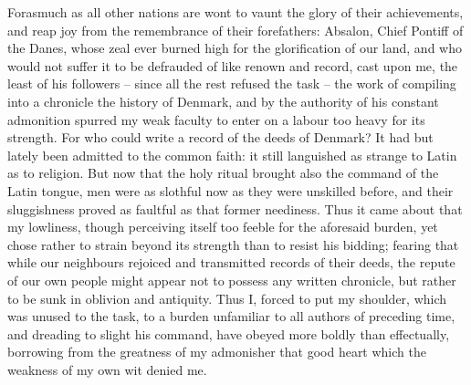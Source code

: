 \documentclass[10pt,a4paper]{report}
\begin{document}
Forasmuch as all other nations are wont to vaunt the glory of their achievements, and reap joy from the remembrance of their forefathers: Absalon, Chief Pontiff of the Danes, whose zeal ever burned high for the glorification of our land, and who would not suffer it to be defrauded of like renown and record, cast upon me, the least of his followers -- since all the rest refused the task -- the work of compiling into a chronicle the history of Denmark, and by the authority of his constant admonition spurred my weak faculty to enter on a labour too heavy for its strength. For who could write a record of the deeds of Denmark? It had but lately been admitted to the common faith: it still languished as strange to Latin as to religion. But now that the holy ritual brought also the command of the Latin tongue, men were as slothful now as they were unskilled before, and their sluggishness proved as faultful as that former neediness. Thus it came about that my lowliness, though perceiving itself too feeble for the aforesaid burden, yet chose rather to strain beyond its strength than to resist his bidding; fearing that while our neighbours rejoiced and transmitted records of their deeds, the repute of our own people might appear not to possess any written chronicle, but rather to be sunk in oblivion and antiquity. Thus I, forced to put my shoulder, which was unused to the task, to a burden unfamiliar to all authors of preceding time, and dreading to slight his command, have obeyed more boldly than effectually, borrowing from the greatness of my admonisher that good heart which the weakness of my own wit denied me.\\
\end{document}
